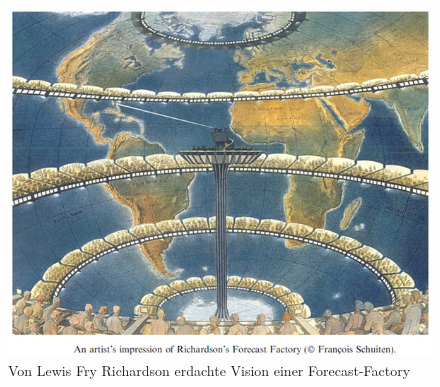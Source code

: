 \begin{refsection}
\begin{figure}
\begin{center}
\includegraphics[width=\hsize]{images/forecast-factory-color.jpg}
\end{center}
\caption{Von Lewis Fry Richardson erdachte Vision einer Forecast-Factory
\label{forecastfactory}}
\end{figure}

\printbibliography[heading=subbibliography]
\end{refsection}
